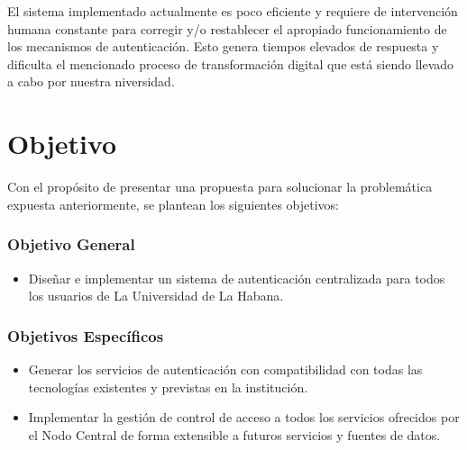 El sistema implementado actualmente es poco eficiente y requiere de intervención humana constante para corregir y/o restablecer el apropiado funcionamiento de los mecanismos de autenticación. Esto genera tiempos elevados de respuesta y dificulta el mencionado proceso de transformación digital que está siendo llevado a cabo por nuestra niversidad.


\section*{Objetivo}
Con el propósito de presentar una propuesta para solucionar la problemática expuesta anteriormente, se plantean los siguientes objetivos:

\subsubsection*{Objetivo General}

\begin{itemize}	
	\item Diseñar e implementar un sistema de autenticación centralizada para todos los usuarios de La Universidad de La Habana. 
\end{itemize}

\subsubsection*{Objetivos Específicos}
\begin{itemize}	
	\item Generar los servicios de autenticación con compatibilidad con todas las tecnologías existentes y previstas en la institución.
	\item Implementar la gestión de control de acceso a todos los servicios ofrecidos por el Nodo Central de forma extensible a futuros servicios y fuentes de datos.
\end{itemize}

